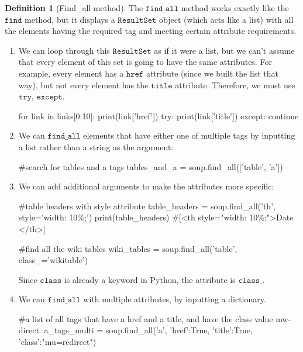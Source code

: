 \documentclass[a4paper, 12pt]{report}
\theoremstyle{remark}
\theoremstyle{definition}
\newtheorem{definition}{Definition}[section]
\begin{document}
\begin{definition}[Find\_all method]
The $\texttt{find\_all}$ method works exactly like the $\texttt{find}$ method, but it displays a $\texttt{ResultSet}$ object (which acts like a list) with all the elements having the required tag and meeting certain attribute requirements. 
\begin{enumerate}
    \item We can loop through this $\texttt{ResultSet}$ as if it were a list, but we can't assume that every element of this set is going to have the same attributes. For example, every element has a $\texttt{href}$ attribute (since we built the list that way), but not every element has the $\texttt{title}$ attribute. Therefore, we must use $\texttt{try, except}$. 
    \begin{python}
    for link in links[0:10]:
        print(link['href'])
        try: 
            print(link['title'])
        except:
            continue
    \end{python}
    
    \item We can $\texttt{find\_all}$ elements that have either one of multiple tags by inputting a list rather than a string as the argument: 
    \begin{python}
    #search for tables and a tags
    tables_and_a = soup.find_all(['table', 'a'])
    \end{python}
    
    \item We can add additional arguments to make the attributes more specific: 
    \begin{python}
    #table headers with style attribute
    table_headers = soup.find_all('th', style='width: 10\%;')
    print(table_headers)
    #[<th style="width: 10\%;">Date </th>]
    
    #find all the wiki tables
    wiki_tables = soup.find_all('table', class_='wikitable')
    \end{python}
    Since $\texttt{class}$ is already a keyword in Python, the attribute is $\texttt{class\_}$. 
    
    \item We can $\texttt{find\_all}$ with multiple attributes, by inputting a dictionary. 
    \begin{python}
    #a list of all tags that have a href and a title, and have the class value mw-direct. 
    a_tags_multi = soup.find_all('a', {'href':True, 'title':True, 'class':"mu=redirect"})
    \end{python}
    

\end{enumerate}
\end{definition}
\end{document}
